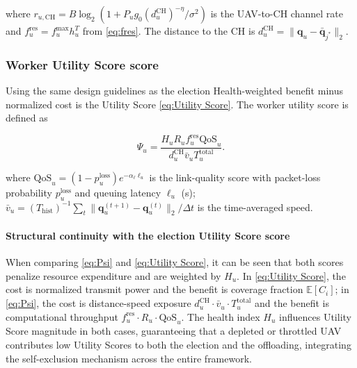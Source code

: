 \documentclass[journal]{IEEEtran}
\begin{document}
\begin{IEEEproof}
where
$r_{u,\mathrm{CH}}=B\log_{2}(1+P_{u}g_{0}
(d_{u}^{\mathrm{CH}})^{-\eta}/\sigma^{2})$
is the UAV-to-CH channel rate and
$f_{u}^{\mathrm{res}}=f_{u}^{\max}h_{u}^{T}$ from
\eqref{eq:fres}.  The distance to the CH is
$d_{u}^{\mathrm{CH}}=\|\mathbf{q}_{u}-\bar{\mathbf{q}}_{j^{*}}\|_{2}$.

\subsubsection{Worker Utility Score score}

Using the same design guidelines as the election Health-weighted benefit minus normalized cost is the Utility Score \eqref{eq:Utility Score}. The worker utility score is defined as

\begin{equation}\label{eq:Psi}
  \Psi_{u}=
  \frac{H_{u} R_{u} f_{u}^{\mathrm{res}}
        \mathrm{QoS}_{u}}
       {d_{u}^{\mathrm{CH}}\bar{v}_{u}
         T_{u}^{\mathrm{total}}}.
\end{equation}

where $\mathrm{QoS}_{u}=(1-p_{u}^{\mathrm{loss}})e^{-\alpha_{\ell}\ell_{u}}$ is the link-quality score with packet-loss probability $p_{u}^{\mathrm{loss}}$ and queuing latency $\ell_{u}$ (s); $\bar{v}_{u}=(T_{\mathrm{hist}})^{-1}\sum_{t} \|\mathbf{q}_{u}^{(t+1)}-\mathbf{q}_{u}^{(t)}\|_{2}/\Delta t$ is the time-averaged speed.

\paragraph{Structural continuity with the election Utility Score
score}
When comparing \eqref{eq:Psi} and \eqref{eq:Utility Score}, it can be seen that both scores penalize resource expenditure and are weighted by $H_{u}$.
In \eqref{eq:Utility Score}, the cost is normalized transmit power and the benefit is coverage fraction $\mathbb{E}[C_{i}]$; in \eqref{eq:Psi}, the cost is distance-speed exposure $d_{u}^{\mathrm{CH}}\cdot\bar{v}_{u}\cdot T_{u}^{\mathrm{total}}$ and the benefit is computational throughput $f_{u}^{\mathrm{res}}\cdot R_{u}\cdot\mathrm{QoS}_{u}$.
The health index $H_{u}$ influences Utility Score magnitude in both cases, guaranteeing that a depleted or throttled UAV contributes low Utility Scores to both the election and the offloading, integrating the self-exclusion mechanism across the entire framework.


\end{IEEEproof}
\end{document}
